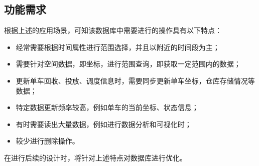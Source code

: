 \subsection{功能需求}
根据上述的应用场景，可知该数据库中需要进行的操作具有以下特点：
\begin{itemize}
    \item 经常需要根据时间属性进行范围选择，并且以附近的时间段为主；
    \item 需要针对空间数据，即坐标，进行范围查询，即获取一定范围内的数据；
    \item 更新单车回收、投放、调度信息时，需要同步更新单车坐标，仓库存储情况等数据；
    \item 特定数据更新频率较高，例如单车的当前坐标、状态信息；
    \item 有时需要读出大量数据，例如进行数据分析和可视化时；
    \item 较少进行删除操作。
\end{itemize}

在进行后续的设计时，将针对上述特点对数据库进行优化。